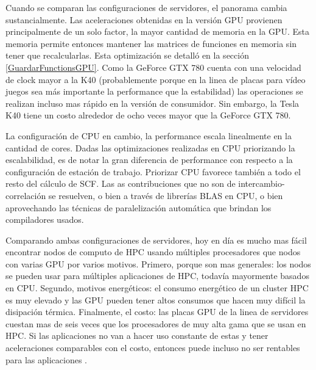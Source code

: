 Cuando se comparan las configuraciones de servidores, el panorama cambia sustancialmente.
Las aceleraciones obtenidas en la versi\'on GPU provienen principalmente de un solo factor,
la mayor cantidad de memoria en la GPU. Esta memoria permite entonces mantener las matrices
de funciones en memoria sin tener que recalcularlas. Esta optimizaci\'on se detall\'o en la secci\'on
\ref{GuardarFunctionsGPU}. Como la GeForce GTX 780 cuenta con una velocidad de clock mayor a
la K40 (probablemente porque en la linea de placas para v\'ideo juegos sea m\'as importante
la performance que la estabilidad) las operaciones se realizan incluso mas r\'apido en la
versi\'on de consumidor. Sin embargo, la Tesla K40 tiene un costo alrededor de ocho veces mayor que la
GeForce GTX 780.

La configuraci\'on de CPU en cambio, la performance escala linealmente en la cantidad de cores.
Dadas las optimizaciones realizadas en CPU priorizando la escalabilidad, es de notar la gran
diferencia de performance con respecto a la configuraci\'on de estaci\'on de trabajo. Priorizar CPU
favorece tambi\'en a todo el resto del c\'alculo de SCF. Las as contribuciones que no son
de intercambio-correlaci\'on se resuelven, o bien a trav\'es de librer\'ias BLAS en CPU, o bien
aprovechando las t\'ecnicas de paralelizaci\'on autom\'atica que brindan los compiladores usados.

Comparando ambas configuraciones de servidores, hoy en d\'ia es mucho mas f\'acil encontrar
nodos de computo de HPC usando m\'ultiples procesadores que nodos con varias GPU por varios motivos.
Primero, porque son mas generales: los nodos se pueden usar para m\'ultiples aplicaciones de HPC,
todav\'ia mayormente basados en CPU. Segundo, motivos energ\'eticos: el consumo energ\'etico de un cluster
HPC es muy elevado y las GPU pueden tener altos consumos que hacen muy dif\'icil la disipaci\'on t\'ermica.
Finalmente, el costo: las placas GPU de la linea de servidores cuestan mas de seis veces que los
procesadores de muy alta gama que se usan en HPC. Si las aplicaciones no van a hacer uso constante
de estas y tener aceleraciones comparables con el costo, entonces puede incluso no ser rentables
para las aplicaciones .


